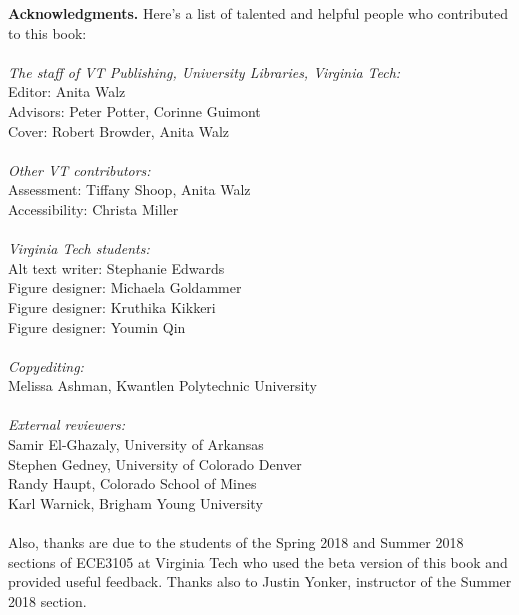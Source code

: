 {\bf Acknowledgments.}
Here's a list of talented and helpful people who contributed to this book:\\
~\\
\emph{The staff of VT Publishing, University Libraries, Virginia Tech:}\\
Editor: Anita Walz\\
Advisors: Peter Potter, Corinne Guimont\\
Cover: Robert Browder, Anita Walz\\
~\\
\emph{Other VT contributors:}\\
Assessment: Tiffany Shoop, Anita Walz\\
Accessibility: Christa Miller\\
~\\
\emph{Virginia Tech students:}\\
Alt text writer: Stephanie Edwards\\
Figure designer: Michaela Goldammer\\
Figure designer: Kruthika Kikkeri\\
Figure designer: Youmin Qin\\
~\\
\emph{Copyediting:}\\
Melissa Ashman, Kwantlen Polytechnic University \\
~\\
\emph{External reviewers:}\\
Samir El-Ghazaly, University of Arkansas\\
Stephen Gedney, University of Colorado Denver\\
Randy Haupt, Colorado School of Mines\\
Karl Warnick, Brigham Young University\\
~\\
Also, thanks are due to the students of the Spring 2018 and Summer 2018 sections of ECE3105 at Virginia Tech who used the beta version of this book and provided useful feedback.  Thanks also to Justin Yonker, instructor of the Summer 2018 section.

